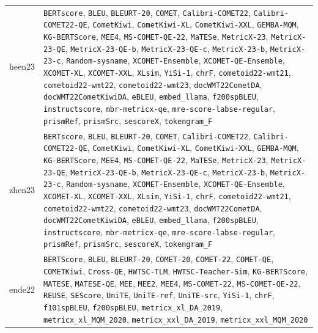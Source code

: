 \documentclass[11pt]{article}
\begin{document}
\begin{table}[t]
\begin{tabular}{l p{}}
heen23 & \texttt{BERTscore}, \texttt{BLEU}, \texttt{BLEURT-20}, \texttt{COMET}, \texttt{Calibri-COMET22}, \texttt{Calibri-COMET22-QE}, \texttt{CometKiwi}, \texttt{CometKiwi-XL}, \texttt{CometKiwi-XXL}, \texttt{GEMBA-MQM}, \texttt{KG-BERTScore}, \texttt{MEE4}, \texttt{MS-COMET-QE-22}, \texttt{MaTESe}, \texttt{MetricX-23}, \texttt{MetricX-23-QE}, \texttt{MetricX-23-QE-b}, \texttt{MetricX-23-QE-c}, \texttt{MetricX-23-b}, \texttt{MetricX-23-c}, \texttt{Random-sysname}, \texttt{XCOMET-Ensemble}, \texttt{XCOMET-QE-Ensemble}, \texttt{XCOMET-XL}, \texttt{XCOMET-XXL}, \texttt{XLsim}, \texttt{YiSi-1}, \texttt{chrF}, \texttt{cometoid22-wmt21}, \texttt{cometoid22-wmt22}, \texttt{cometoid22-wmt23}, \texttt{docWMT22CometDA}, \texttt{docWMT22CometKiwiDA}, \texttt{eBLEU}, \texttt{embed\_llama}, \texttt{f200spBLEU}, \texttt{instructscore}, \texttt{mbr-metricx-qe}, \texttt{mre-score-labse-regular}, \texttt{prismRef}, \texttt{prismSrc}, \texttt{sescoreX}, \texttt{tokengram\_F} \\
\addlinespace
zhen23 & \texttt{BERTscore}, \texttt{BLEU}, \texttt{BLEURT-20}, \texttt{COMET}, \texttt{Calibri-COMET22}, \texttt{Calibri-COMET22-QE}, \texttt{CometKiwi}, \texttt{CometKiwi-XL}, \texttt{CometKiwi-XXL}, \texttt{GEMBA-MQM}, \texttt{KG-BERTScore}, \texttt{MEE4}, \texttt{MS-COMET-QE-22}, \texttt{MaTESe}, \texttt{MetricX-23}, \texttt{MetricX-23-QE}, \texttt{MetricX-23-QE-b}, \texttt{MetricX-23-QE-c}, \texttt{MetricX-23-b}, \texttt{MetricX-23-c}, \texttt{Random-sysname}, \texttt{XCOMET-Ensemble}, \texttt{XCOMET-QE-Ensemble}, \texttt{XCOMET-XL}, \texttt{XCOMET-XXL}, \texttt{XLsim}, \texttt{YiSi-1}, \texttt{chrF}, \texttt{cometoid22-wmt21}, \texttt{cometoid22-wmt22}, \texttt{cometoid22-wmt23}, \texttt{docWMT22CometDA}, \texttt{docWMT22CometKiwiDA}, \texttt{eBLEU}, \texttt{embed\_llama}, \texttt{f200spBLEU}, \texttt{instructscore}, \texttt{mbr-metricx-qe}, \texttt{mre-score-labse-regular}, \texttt{prismRef}, \texttt{prismSrc}, \texttt{sescoreX}, \texttt{tokengram\_F} \\
\addlinespace
ende22 & \texttt{BERTScore}, \texttt{BLEU}, \texttt{BLEURT-20}, \texttt{COMET-20}, \texttt{COMET-22}, \texttt{COMET-QE}, \texttt{COMETKiwi}, \texttt{Cross-QE}, \texttt{HWTSC-TLM}, \texttt{HWTSC-Teacher-Sim}, \texttt{KG-BERTScore}, \texttt{MATESE}, \texttt{MATESE-QE}, \texttt{MEE}, \texttt{MEE2}, \texttt{MEE4}, \texttt{MS-COMET-22}, \texttt{MS-COMET-QE-22}, \texttt{REUSE}, \texttt{SEScore}, \texttt{UniTE}, \texttt{UniTE-ref}, \texttt{UniTE-src}, \texttt{YiSi-1}, \texttt{chrF}, \texttt{f101spBLEU}, \texttt{f200spBLEU}, \texttt{metricx\_xl\_DA\_2019}, \texttt{metricx\_xl\_MQM\_2020}, \texttt{metricx\_xxl\_DA\_2019}, \texttt{metricx\_xxl\_MQM\_2020} \\

\end{tabular}
\end{table}
\end{document}
